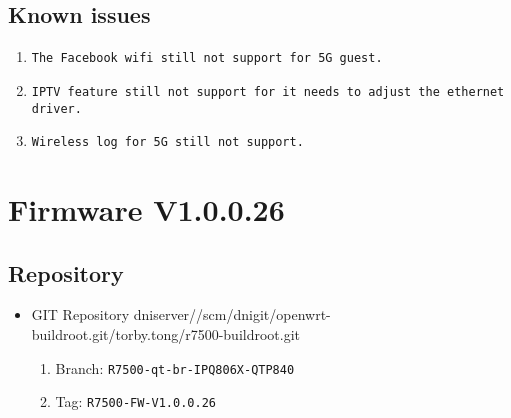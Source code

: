 \documentclass[12pt]{report}
\newcommand{\tlabel}[1]{
  \label{#1}%
  }
\begin{document}
\subsection{Known issues}
            \begin{enumerate}
		\item \texttt{The Facebook wifi still not support for 5G guest.}
		\item \texttt{IPTV feature still not support for it needs to adjust the ethernet driver.}
		\item \texttt{Wireless log for 5G still not support.}
            \end{enumerate}

\section{Firmware V1.0.0.26}

\tlabel{sec:1-0-1}
\subsection{Repository}
\begin{itemize}
	\item GIT Repository dniserver//scm/dnigit/openwrt-buildroot.git/torby.tong/r7500-buildroot.git
	\begin{enumerate}
		\item Branch: \texttt{R7500-qt-br-IPQ806X-QTP840}
                \item Tag: \texttt{R7500-FW-V1.0.0.26}
	\end{enumerate}
\end{itemize}
\end{document}
